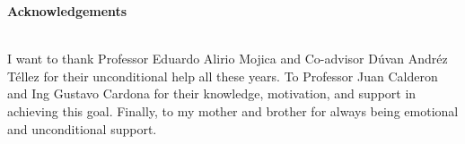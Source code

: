 
\thispagestyle{empty} \textbf{}\normalsize
\vspace{1.5cm}%

\begin{flushright}
\begin{minipage}{8cm}
    \noindent
        \small
\end{minipage}
\end{flushright}


\newpage
\thispagestyle{empty} \textbf{}\normalsize
\vspace{1.5cm}%
\textbf{\LARGE Acknowledgements}
\vspace{2cm}
\\
I want to thank Professor Eduardo Alirio Mojica and Co-advisor D\'uvan Andr\'ez T\'ellez for their unconditional help all these years. To Professor Juan Calderon and Ing Gustavo Cardona for their knowledge, motivation, and support in achieving this goal. Finally, to my mother and brother for always being emotional and unconditional support.

\vspace{0.5cm}


